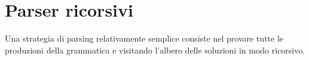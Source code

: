 \chapter{Parser ricorsivi}
\label{cha:parser-ricorsivi}

Una strategia di parsing relativamente semplice consiste nel provare tutte le
produzioni della grammatica e visitando l'albero delle soluzioni in modo ricorsivo.

